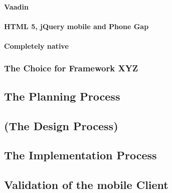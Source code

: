\paragraph{Vaadin}
\paragraph{HTML 5, jQuery mobile and Phone Gap}
\paragraph{Completely native}
\subsubsection{The Choice for Framework XYZ}
\subsection{The Planning Process}
\subsection{(The Design Process)}
\subsection{The Implementation Process}
\subsection{Validation of the mobile Client}